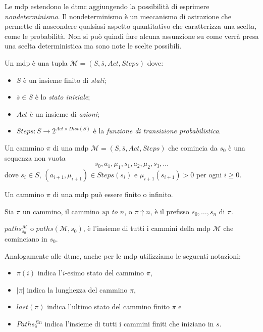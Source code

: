 Le \ac{mdp} estendono le \ac{dtmc} aggiungendo la possibilità di esprimere \emph{nondeterminismo}. Il nondeterminismo è un meccanismo di astrazione che permette di nascondere qualsiasi aspetto quantitativo che caratterizza una scelta, come le probabilità. Non si può quindi fare alcuna assunzione su come verrà presa una scelta deterministica ma sono note le scelte possibili.

\begin{mtdef}
	Un \ac{mdp} è una tupla $\mathcal{M} = (S, \overline{s}, Act, Steps)$ dove:
	\begin{itemize}
		\item $S$ è un insieme finito di \emph{stati};
		\item $\overline{s} \in S$ è lo \emph{stato iniziale};
		\item $Act$ è un insieme di \emph{azioni};
		\item $Steps: S \rightarrow 2^{Act \times Dist(S)}$ è la \emph{funzione di transizione probabilistica}.
	\end{itemize}
\end{mtdef}

\begin{mtdef}
	Un cammino $\pi$ di una \ac{mdp} $\mathcal{M} = (S,\overline{s},Act,Steps)$ che comincia da $s_0$ è una sequenza non vuota $$s_0, a_1, \mu_1, s_1, a_2, \mu_2, s_3, \dots$$ dove $s_i \in S$, $(a_{i+1},\mu_{i+1})\in Steps(s_i)$ e $\mu_{i+1}(s_{i+1}) > 0$ per ogni $i\geq 0$.
\end{mtdef}

\begin{mtobs}
	Un cammino $\pi$ di una \ac{mdp} può essere finito o infinito.
\end{mtobs}

\begin{mtdef}
	Sia $\pi$ un cammino, il cammino \emph{up to $n$}, o $\pi \uparrow n$, è il prefisso $s_0, \dots, s_n$ di $\pi$.
\end{mtdef}

\begin{mtdef}
	$paths_{s_0}^{\mathcal{M}}$ o $paths(\mathcal{M}, s_0)$, è l'insieme di tutti i cammini della \ac{mdp} $\mathcal{M}$ che cominciano in $s_0$.
\end{mtdef}

Analogamente alle \ac{dtmc}, anche per le \ac{mdp} utilizziamo le seguenti notazioni:
\begin{itemize}
	\item $\pi(i)$ indica l'$i$-esimo stato del cammino $\pi$,
	\item $|\pi|$ indica la lunghezza del cammino $\pi$,
	\item $last(\pi)$ indica l'ultimo stato del cammino finito $\pi$ e
	\item $Paths^{fin}_s$ indica l'insieme di tutti i cammini finiti che iniziano in $s$.
\end{itemize}

